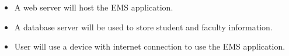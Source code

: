 \begin{itemize}
  \item A web server will host the EMS application. 
  \item A database server will be used to store student and faculty information.
  \item User will use a device with internet connection to use the EMS application.
\end{itemize}  
  
